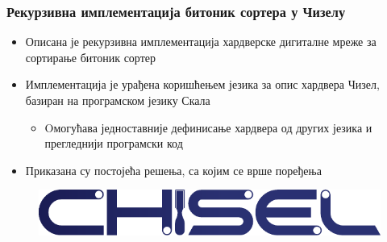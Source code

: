 \begin{frame}
\frametitle{Рекурзивна имплементација битоник сортера у Чизелу}

 \begin{itemize}
  \item Описана је рекурзивна имплементација хардверске дигиталне мреже за сортирање битоник сортер
  \item Имплементација је урађена коришћењем језика за опис хардвера Чизел, базиран на програмском језику Скала
  \begin{itemize}
   \item Oмогућава једноставније дефинисање хардвера од других језика и прегледнији програмски код
  \end{itemize}
  \item Приказана су постојећа решења, са којим се врше поређења
 \end{itemize}
\hspace{1cm}
 \begin{figure}[H]
   \centering
       \includegraphics[scale=0.5]{slike/chisel_logo.pdf}
 \end{figure}

\end{frame}

